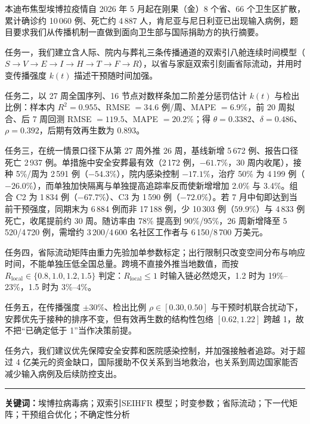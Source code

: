 本迪布焦型埃博拉疫情自 2026 年 5 月起在刚果（金）8 个省、66 个卫生区扩散，累计确诊约 10\,060 例、死亡约 4\,887 人，肯尼亚与尼日利亚已出现输入病例，题目要求我们从传播机制一直做到面向卫生部与国际捐助方的执行摘要。

任务一，我们建立含人际、院内与葬礼三条传播通道的双索引八舱连续时间模型（$S\to V\to E\to I\to H\to T\to F\to R$），以省与家庭双索引刻画省际流动，并用时变传播强度 $k(t)$ 描述干预随时间加强。

任务二，以 27 周全国序列、16 节点对数样条加二阶差分惩罚估计 $k(t)$ 与检出比例：样本内 $R^2=0.955$、RMSE $=34.6$ 例/周、MAPE $=6.9\%$，前 20 周拟合、后 7 周回测 RMSE $=119.5$、MAPE $=20.2\%$；得 $\theta=0.3382$、$\delta=0.486$、$\rho=0.392$，后期有效再生数为 0.893。

任务三，在统一情景口径下从第 27 周外推 26 周，基线新增 5\,672 例、报告口径死亡 2\,937 例。单措施中安全安葬最有效（2\,172 例，$-61.7\%$，30 周内收尾），接种 5\%/周为 2\,591 例（$-54.3\%$），院内感染控制 $-17.1\%$，治疗 50\% 为 4\,199 例（$-26.0\%$），而单独加快隔离与单独提高追踪率反而使新增增加 2.0\% 与 3.4\%。组合 C2 为 1\,834 例（$-67.7\%$）、C3 为 1\,590 例（$-72.0\%$）。若 7 月中旬即达到当前干预强度，同期末为 6\,884 例而非 17\,188 例，少 10\,303 例（$59.9\%$）与 4\,833 例死亡，收尾提前约 30 周。随访率由 78\% 提高到 90\%/95\%，26 周新增降至 5\,520/4\,720 例，需增约 3\,200/4\,600 名社区工作者与 6\,150/8\,700 万美元。

任务四，省际流动矩阵由重力先验加单参数标定；出行限制只改变空间分布与响应时间，不能单独压低全国总量。跨境不直接外推当地数值，而按 $R_{\mathrm{local}}\in\{0.8,1.0,1.2,1.5\}$ 判定：$R_{\mathrm{local}}\le 1$ 时输入链必然熄灭，1.2 时为 19\%--23\%，1.5 时为 3\%--4\%。

任务五，在传播强度 $\pm30\%$、检出比例 $\rho\in[0.30,0.50]$ 与干预时机联合扰动下，安葬优先于接种的排序不变，但有效再生数的结构性包络 $[0.62,1.22]$ 跨越 1，故不把“已确定低于 1”当作决策前提。

任务六，我们建议优先保障安全安葬和医院感染控制，并加强接触者追踪。对于超过 4 亿美元的资金缺口，国际援助不仅关系到当地救治，也关系到周边国家能否减少输入病例及后续防控支出。  
  
\noindent\rule{\linewidth}{0.4pt}
                                          
\noindent\textbf{关键词：}埃博拉病毒病；双索引SEIHFR 模型；时变参数；省际流动；下一代矩阵；干预组合优化；不确定性分析